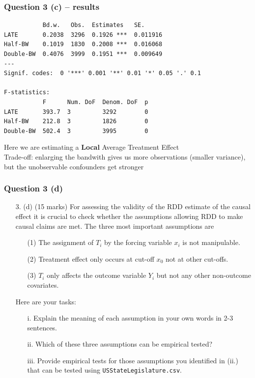 \documentclass[xcolor=table,dvipsnames]{beamer}
\begin{document}
\begin{frame}[fragile]
\frametitle{Question 3 (c) -- results}
\begin{small}
\begin{verbatim}
           Bd.w.   Obs.  Estimates   SE.         
LATE       0.2038  3296  0.1926 ***  0.011916 
Half-BW    0.1019  1830  0.2008 ***  0.016068 
Double-BW  0.4076  3999  0.1951 ***  0.009649 
---
Signif. codes:  0 '***' 0.001 '**' 0.01 '*' 0.05 '.' 0.1

F-statistics:
           F      Num. DoF  Denom. DoF  p
LATE       393.7  3         3292        0
Half-BW    212.8  3         1826        0
Double-BW  502.4  3         3995        0
\end{verbatim}
\end{small}\pause

Here we are estimating a \textbf{Local} Average Treatment Effect \pause \\
Trade-off: enlarging the bandwith gives us more observations (smaller variance), but the unobservable confounders get stronger
\end{frame}

\begin{frame}
\frametitle{Question 3 (d)}
\begin{enumerate}
\item[3.] (d) (15 marks) For assessing the validity of the RDD estimate of the causal effect it is crucial to check whether the assumptions allowing RDD to make causal claims are met. 
The three most important assumptions are \pause
\begin{enumerate}
\item[(1)] The assignment of $T_i$ by the forcing variable $x_i$ is not manipulable. 
\item[(2)] Treatment effect only occurs at cut-off $x_0$ not at other cut-offs. 
\item[(3)] $T_i$ only affects the outcome variable $Y_i$ but not any other non-outcome covariates. \pause
\end{enumerate}
Here are your tasks: 
\begin{enumerate}
\item[i.] Explain the meaning of each assumption in your own words in 2-3 sentences. 
\item[ii.] Which of these three assumptions can be empirical tested?
\item[iii.] Provide empirical tests for those assumptions you identified in (ii.) that can be tested using \texttt{USStateLegislature.csv}.
\end{enumerate}
\end{enumerate}
\end{frame}
\end{document}
